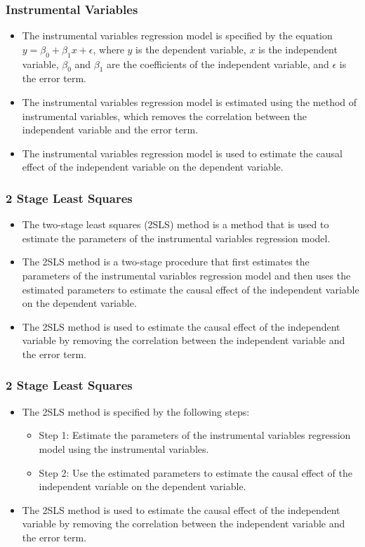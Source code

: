 \documentclass[serif, 9pt, aspectratio=32]{beamer}
\begin{document}
\begin{frame}
    \frametitle{Instrumental Variables}
    \begin{itemize}
        \setlength{\itemsep}{2em}
        \item The instrumental variables regression model is specified by the equation $y = \beta_0 + \beta_1 x + \epsilon$, where $y$ is the dependent variable, $x$ is the independent variable, $\beta_0$ and $\beta_1$ are the coefficients of the independent variable, and $\epsilon$ is the error term.
        \item The instrumental variables regression model is estimated using the method of instrumental variables, which removes the correlation between the independent variable and the error term.
        \item The instrumental variables regression model is used to estimate the causal effect of the independent variable on the dependent variable.
    \end{itemize}
\end{frame}

\begin{frame}
    \frametitle{2 Stage Least Squares}
    \begin{itemize}
        \setlength{\itemsep}{2em}
        \item The two-stage least squares (2SLS) method is a method that is used to estimate the parameters of the instrumental variables regression model.
        \item The 2SLS method is a two-stage procedure that first estimates the parameters of the instrumental variables regression model and then uses the estimated parameters to estimate the causal effect of the independent variable on the dependent variable.
        \item The 2SLS method is used to estimate the causal effect of the independent variable by removing the correlation between the independent variable and the error term.
    \end{itemize}
\end{frame}

\begin{frame}
    \frametitle{2 Stage Least Squares}
    \begin{itemize}
        \setlength{\itemsep}{2em}
        \item The 2SLS method is specified by the following steps:
              \begin{itemize}
                  \item Step 1: Estimate the parameters of the instrumental variables regression model using the instrumental variables.
                  \item Step 2: Use the estimated parameters to estimate the causal effect of the independent variable on the dependent variable.
              \end{itemize}
        \item The 2SLS method is used to estimate the causal effect of the independent variable by removing the correlation between the independent variable and the error term.
    \end{itemize}
\end{frame}
\end{document}
